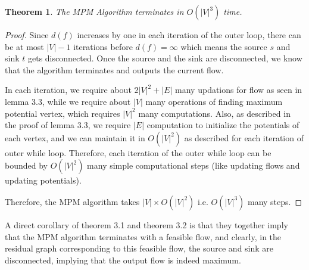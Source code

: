 \documentclass[12pt]{article}
\newtheorem{theorem}{Theorem}[section]
\begin{document}
\begin{theorem}
	The MPM Algorithm terminates in $O(|V|^3)$ time.
\end{theorem}
\begin{proof}
	Since $d(f)$ increases by one in each iteration of the outer loop, there can be at most $|V|-1$ iterations before $d(f) = \infty$ which means the source $s$ and sink $t$ gets disconnected. Once the source and the sink are disconnected, we know that the algorithm terminates and outputs the current flow.\par 
	In each iteration, we require about $2|V|^2 + |E|$ many updations for flow as seen in lemma 3.3, while we require about $|V|$ many operations of finding maximum potential vertex, which requires $|V|^2$ many computations. Also, as described in the proof of lemma 3.3, we require $|E|$ computation to initialize the potentials of each vertex, and we can maintain it in $O(|V|^2)$ as described for each iteration of outer while loop. Therefore, each iteration of the outer while loop can be bounded by $O(|V|^2)$ many simple computational steps (like updating flows and updating potentials).\par 
	Therefore, the MPM algorithm takes $|V|\times O(|V|^2)$ i.e. $O(|V|^3)$ many steps.
\end{proof}

A direct corollary of theorem 3.1 and theorem 3.2 is that they together imply that the MPM algorithm terminates with a feasible flow, and clearly, in the residual graph corresponding to this feasible flow, the source and sink are disconnected, implying that the output flow is indeed maximum.
\end{document}
